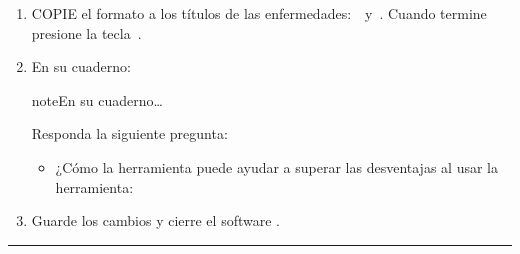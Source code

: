 \documentclass[letterpaper,10pt,spanish]{sphinxmanual}
\begin{document}
\begin{enumerate}
\begin{sphinxadmonition}{note}{¿Qué esta pasando en el mouse?}

\sphinxAtStartPar
El  ahora tendrá un  de un , esto quiere decir que cualquier palabra que seleccione, recibirá el formato previamente seleccionado.

\sphinxAtStartPar
Cuando termine de clonar formato, presione la tecla .
\end{sphinxadmonition}

\item {} 
\sphinxAtStartPar
COPIE el formato a los títulos de las enfermedades:  y . Cuando termine presione la tecla .

\item {} 
\sphinxAtStartPar
En su cuaderno:

\begin{sphinxadmonition}{note}{En su cuaderno…}

\sphinxAtStartPar
Responda la siguiente pregunta:
\begin{itemize}
\item {} 
\sphinxAtStartPar
¿Cómo la herramienta  puede ayudar a superar las desventajas al usar la herramienta: 

\end{itemize}
\end{sphinxadmonition}

\item {} 
\sphinxAtStartPar
Guarde los cambios y cierre el software .

\end{enumerate}


\bigskip\hrule\bigskip
\end{document}
